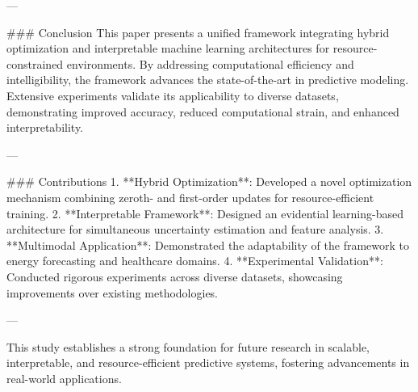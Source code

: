 ---

### Conclusion  
This paper presents a unified framework integrating hybrid optimization and interpretable machine learning architectures for resource-constrained environments. By addressing computational efficiency and intelligibility, the framework advances the state-of-the-art in predictive modeling. Extensive experiments validate its applicability to diverse datasets, demonstrating improved accuracy, reduced computational strain, and enhanced interpretability.

---

### Contributions  
1. **Hybrid Optimization**: Developed a novel optimization mechanism combining zeroth- and first-order updates for resource-efficient training.  
2. **Interpretable Framework**: Designed an evidential learning-based architecture for simultaneous uncertainty estimation and feature analysis.  
3. **Multimodal Application**: Demonstrated the adaptability of the framework to energy forecasting and healthcare domains.  
4. **Experimental Validation**: Conducted rigorous experiments across diverse datasets, showcasing improvements over existing methodologies.

--- 

This study establishes a strong foundation for future research in scalable, interpretable, and resource-efficient predictive systems, fostering advancements in real-world applications.